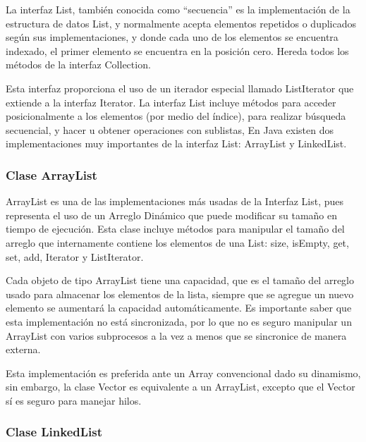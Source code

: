 \documentclass[11pt]{article}
\begin{document}
La interfaz List, también conocida como “secuencia” es la 
implementación de la estructura de datos List, y normalmente acepta 
elementos repetidos o duplicados según sus implementaciones, y donde 
cada uno de los elementos se encuentra indexado, el primer elemento 
se encuentra en la posición cero. Hereda todos los métodos de la 
interfaz Collection.

\par

Esta interfaz proporciona el uso de un iterador especial llamado 
ListIterator que extiende a la interfaz Iterator. La interfaz List 
incluye métodos para acceder posicionalmente a los elementos (por 
medio del índice), para realizar búsqueda secuencial, y hacer u 
obtener operaciones con sublistas, En Java existen dos 
implementaciones muy importantes de la interfaz List: ArrayList y 
LinkedList. 

\subsubsection{Clase ArrayList}
\par

ArrayList es una de las implementaciones más usadas de la Interfaz 
List, pues representa el uso de un Arreglo Dinámico que puede 
modificar su tamaño en tiempo de ejecución. Esta clase incluye 
métodos para manipular el tamaño del arreglo que internamente 
contiene los elementos de una List: size, isEmpty, get, set, add, 
Iterator y ListIterator.

\par

Cada objeto de tipo ArrayList tiene una capacidad, que es el tamaño 
del arreglo usado para almacenar los elementos de la lista, siempre 
que se agregue un nuevo elemento se aumentará la capacidad 
automáticamente. Es importante saber que esta implementación no está 
sincronizada, por lo que no es seguro manipular un ArrayList con 
varios subprocesos a la vez a menos que se sincronice de manera 
externa. 
\par

Esta implementación es preferida ante un Array convencional dado su 
dinamismo, sin embargo, la clase Vector es equivalente a un 
ArrayList, excepto que el Vector sí es seguro para manejar hilos.

\subsubsection{Clase LinkedList}
\par
\end{document}
